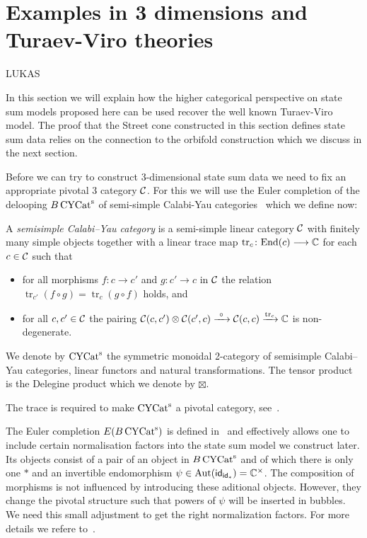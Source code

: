 \section{Examples in 3 dimensions and Turaev-Viro theories}\label{sec:3D}

LUKAS

In this section we will explain how the higher categorical perspective on state sum models proposed here can be used recover the well known Turaev-Viro model. The proof that the Street cone constructed in this section defines state sum data relies on the connection to the orbifold construction which we discuss in the next section.

Before we can try to construct 3-dimensional state sum data we need to fix an appropriate pivotal 3 category $\mathcal{C}$. For this we will use the Euler completion of the delooping $B\operatorname{\mathrm{CYCat}^s}$ of semi-simple Calabi-Yau categories~\cite{3DOrb} which we define now:

\begin{definition}
	A \emph{semisimple Calabi--Yau category} is a semi-simple linear category $\mathcal{C}$ with finitely many simple objects together with a linear
	trace map $\operatorname{tr}_c \colon \mathrm{End} (c) \longrightarrow \mathbb{C}$ for each $c\in \mathcal{C}$ such that
	\begin{itemize}
		\item
		for all morphisms $f\colon c \longrightarrow c'$ and $g\colon c' \longrightarrow c$ in $\mathcal{C}$ the relation $\operatorname{tr}_{c'}(f\circ g)= \operatorname{tr}_c({g\circ f})$ holds, and
		\item
		for all $c,c'\in \mathcal{C}$ the pairing $\mathcal{C}(c,c') \otimes \mathcal{C}(c',c) \xrightarrow{\  \circ  \ } \mathcal{C}(c,c) \xrightarrow{\operatorname{tr}_c} \mathbb{C}$ is non-degenerate.
	\end{itemize}
We denote by $\operatorname{\mathrm{CYCat}^s}$ the symmetric monoidal 2-category of semisimple Calabi--Yau categories, linear functors and natural transformations. The tensor product is the Delegine product which we denote by $\boxtimes$. 
\end{definition}
The trace is required to make $\operatorname{\mathrm{CYCat}^s}$ a pivotal category, see~\cite[Proposition 5.6]{3DOrb}.  

The Euler completion $E(B\operatorname{\mathrm{CYCat}^s})$ is defined in~\cite[Section 5.1.3]{3DOrb} and effectively allows one to include certain normalisation factors into the state sum model we construct later. Its objects consist of a pair of an object in $B\operatorname{\mathrm{CYCat}^s}$ and of which there is only one $*$ and an invertible endomorphism $\psi \in \operatorname{Aut} (\mathsf{id}_{\mathsf{id}_*})=\mathbb{C}^\times$. The composition of morphisms is not influenced by introducing these aditional objects. However, they change the pivotal structure such that powers of $\psi$ will be inserted in bubbles. We need this small adjustment to get the right normalization factors. For more details we refere to~\cite[Section 5.1.3]{3DOrb}.  


